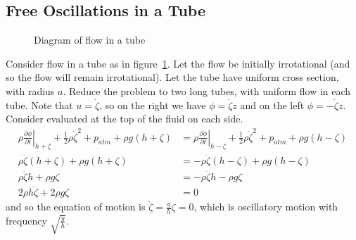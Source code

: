 \documentclass[../Main.tex]{subfiles}
\begin{document}
\subsection{Free Oscillations in a Tube}
\begin{figure}
    \centering
    \caption{Diagram of flow in a tube}
    \label{figFlowTube}
\end{figure}
Consider flow in a tube as in figure~\ref{figFlowTube}. Let the flow be initially irrotational (and so the flow will remain irrotational). Let the tube have uniform cross section, with radius $a$. Reduce the problem to two long tubes, with uniform flow in each tube. Note that $u = \dot{\zeta}$, so on the right we have $\phi = \dot{\zeta} z$ and on the left $\phi = -\dot{\zeta} z$. Consider  evaluated at the top of the fluid on each side.
\begin{align*}
    \rho \left. \frac{\partial \phi}{\partial t}\right|_{h + \zeta} + \frac12 \rho \dot{\zeta}^2 + p_{atm} + \rho g (h + \zeta) &= \rho \left. \frac{\partial \phi}{\partial t}\right|_{h - \zeta} + \frac12 \rho \dot{\zeta}^2 + p_{atm} + \rho g (h - \zeta) \\
    \rho \ddot{\zeta} (h + \zeta) + \rho g (h + \zeta) &= -\rho \ddot{\zeta}(h - \zeta) + \rho g (h - \zeta) \\
    \rho \ddot{\zeta} h + \rho g \zeta &= -\rho \ddot{\zeta} h - \rho g \zeta \\
    2\rho h \ddot{\zeta} + 2 \rho g \zeta &= 0
\end{align*}
and so the equation of motion is $\ddot{\zeta} = \frac{g}{h} \zeta = 0$, which is oscillatory motion with frequency $\sqrt{\frac{g}{h}}$.
\end{document}
